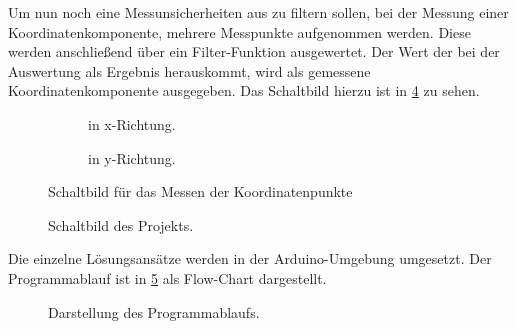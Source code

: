 Um nun noch eine Messunsicherheiten aus zu filtern sollen, bei der Messung einer Koordinatenkomponente, mehrere Messpunkte aufgenommen werden.
Diese werden anschließend über ein Filter-Funktion ausgewertet.
Der Wert der bei der Auswertung als Ergebnis herauskommt, wird als gemessene Koordinatenkomponente ausgegeben.
Das Schaltbild hierzu ist in \cref{fig:schaltbild} zu sehen.

\begin{figure}[ht!]
    \begin{subfigure}{0.49\textwidth}
        \centering
        
        \caption{in x-Richtung.}
        \label{fig:xlesen}
    \end{subfigure}
    \hfill
    \begin{subfigure}{0.49\textwidth}
        \centering
        
        \caption{in y-Richtung.}
        \label{fig:ylesen}
    \end{subfigure}
    \caption{Schaltbild für das Messen der Koordinatenpunkte}
    \label{fig:xylesen}
\end{figure}
\begin{figure}[ht!]
    \centering
    
    \caption{Schaltbild des Projekts.}
    \label{fig:schaltbild}
\end{figure}
Die einzelne Lösungsansätze werden in der Arduino-Umgebung umgesetzt.
Der Programmablauf ist in \cref{fig:flowchart} als Flow-Chart dargestellt.

\begin{figure}
    \centering
    
    \caption{Darstellung des Programmablaufs.}
    \label{fig:flowchart}
\end{figure}
